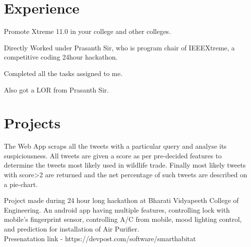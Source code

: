 \documentclass[]{deedy-resume-openfont}
\begin{document}
\begin{minipage}[t]{0.66\textwidth} 

\section{Experience }

\sectionsep


\vspace{\topsep} %
\begin{tightemize}
\item Promote Xtreme 11.0 in your college and other colleges.\item Directly Worked under Prasanth Sir, who is program chair of IEEEXtreme, a competitive coding 24hour hackathon. \item Completed all the tasks assigned to me. \item Also got a LOR from Prasanth Sir. \end{tightemize}
\sectionsep



\section{Projects}

The Web App scraps all the tweets with a particular query and analyse its suspiciousness. All tweets are given a score as per pre-decided features to determine the tweets most likely used in wildlife trade. Finally most likely tweets with score>2 are returned and the net percentage of such tweets are described on a pie-chart.
\sectionsep

Project made during 24 hour long hackathon at Bharati Vidyapeeth College of Engineering. An android app having multiple features, controlling lock with mobile's fingerprint sensor, controlling A/C from mobile, mood lighting control, and prediction for installation of Air Purifier.\\ Presenatation link - https://devpost.com/software/smarthabitat
\sectionsep


\end{minipage}
\end{document}
